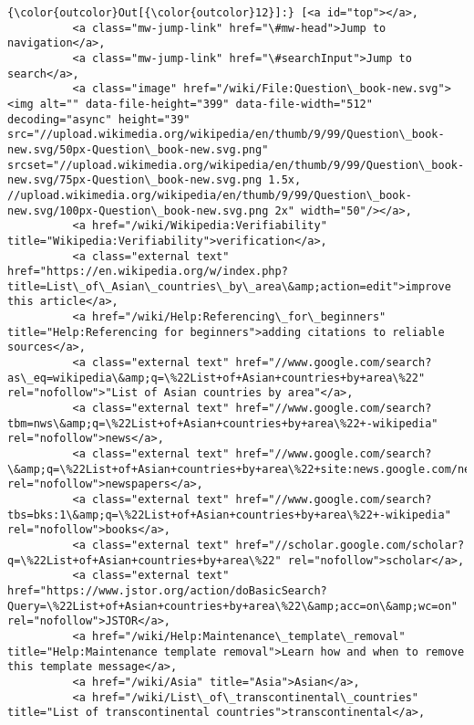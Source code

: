 \documentclass[11pt]{article}
\begin{document}
\begin{Verbatim}[commandchars=\\\{\}]
{\color{outcolor}Out[{\color{outcolor}12}]:} [<a id="top"></a>,
          <a class="mw-jump-link" href="\#mw-head">Jump to navigation</a>,
          <a class="mw-jump-link" href="\#searchInput">Jump to search</a>,
          <a class="image" href="/wiki/File:Question\_book-new.svg"><img alt="" data-file-height="399" data-file-width="512" decoding="async" height="39" src="//upload.wikimedia.org/wikipedia/en/thumb/9/99/Question\_book-new.svg/50px-Question\_book-new.svg.png" srcset="//upload.wikimedia.org/wikipedia/en/thumb/9/99/Question\_book-new.svg/75px-Question\_book-new.svg.png 1.5x, //upload.wikimedia.org/wikipedia/en/thumb/9/99/Question\_book-new.svg/100px-Question\_book-new.svg.png 2x" width="50"/></a>,
          <a href="/wiki/Wikipedia:Verifiability" title="Wikipedia:Verifiability">verification</a>,
          <a class="external text" href="https://en.wikipedia.org/w/index.php?title=List\_of\_Asian\_countries\_by\_area\&amp;action=edit">improve this article</a>,
          <a href="/wiki/Help:Referencing\_for\_beginners" title="Help:Referencing for beginners">adding citations to reliable sources</a>,
          <a class="external text" href="//www.google.com/search?as\_eq=wikipedia\&amp;q=\%22List+of+Asian+countries+by+area\%22" rel="nofollow">"List of Asian countries by area"</a>,
          <a class="external text" href="//www.google.com/search?tbm=nws\&amp;q=\%22List+of+Asian+countries+by+area\%22+-wikipedia" rel="nofollow">news</a>,
          <a class="external text" href="//www.google.com/search?\&amp;q=\%22List+of+Asian+countries+by+area\%22+site:news.google.com/newspapers\&amp;source=newspapers" rel="nofollow">newspapers</a>,
          <a class="external text" href="//www.google.com/search?tbs=bks:1\&amp;q=\%22List+of+Asian+countries+by+area\%22+-wikipedia" rel="nofollow">books</a>,
          <a class="external text" href="//scholar.google.com/scholar?q=\%22List+of+Asian+countries+by+area\%22" rel="nofollow">scholar</a>,
          <a class="external text" href="https://www.jstor.org/action/doBasicSearch?Query=\%22List+of+Asian+countries+by+area\%22\&amp;acc=on\&amp;wc=on" rel="nofollow">JSTOR</a>,
          <a href="/wiki/Help:Maintenance\_template\_removal" title="Help:Maintenance template removal">Learn how and when to remove this template message</a>,
          <a href="/wiki/Asia" title="Asia">Asian</a>,
          <a href="/wiki/List\_of\_transcontinental\_countries" title="List of transcontinental countries">transcontinental</a>,

\end{Verbatim}
\end{document}
